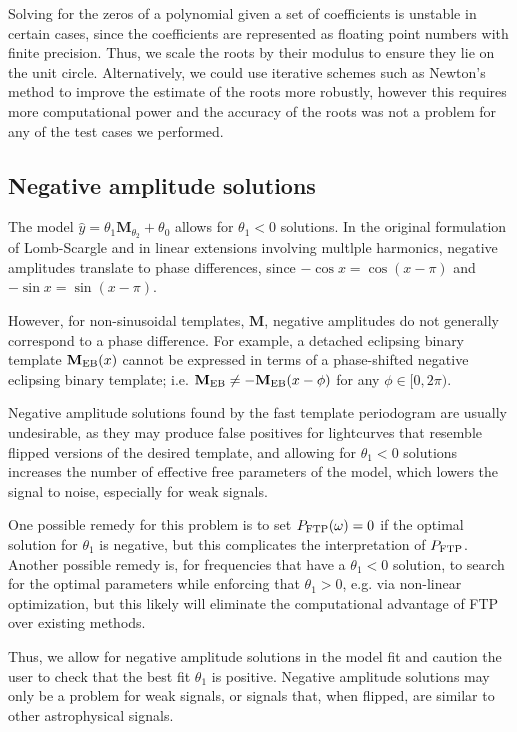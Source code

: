 \documentclass[apj]{emulateapj}
\newcommand{\Mshft}{\mathbf{M}_{\theta_2}}
\begin{document}
Solving for the zeros of a polynomial given a set of coefficients is unstable in certain cases, since the 
coefficients are represented as floating point numbers with finite precision. Thus, we scale the roots
by their modulus to ensure they lie on the unit circle. Alternatively, we could use iterative schemes
such as Newton's method to improve the estimate of the roots more robustly, however this requires more computational power and 
the accuracy of the roots was not a problem for any of the test cases we performed.


\subsection{Negative amplitude solutions}
The model $\hat{y}= \theta_1\Mshft + \theta_0$ allows for $\theta_1 < 0$ solutions. 
In the original formulation of Lomb-Scargle and in linear
extensions involving multlple harmonics, negative amplitudes translate to
phase differences, since $-\cos{x} = \cos(x - \pi)$ and $-\sin{x} = \sin(x - \pi)$.

However, for non-sinusoidal templates, $\mathbf{M}$, negative amplitudes
do not generally correspond to a phase difference. For example, a 
detached eclipsing binary template $\mathbf{M}_{\rm EB}(x)$ cannot be 
expressed in terms of a phase-shifted negative eclipsing binary template; i.e.
$\mathbf{M}_{\rm EB} \neq - \mathbf{M}_{\rm EB}(x - \phi)$ for any $\phi\in[0, 2\pi)$.

Negative amplitude solutions found by the fast template periodogram are usually
undesirable, as they may produce false positives for lightcurves that resemble
flipped versions of the desired template, and allowing for $\theta_1 < 0$ solutions
increases the number of effective free parameters of the model, which lowers
the signal to noise, especially for weak signals.

One possible remedy for this problem is to set $P_{\rm FTP}(\omega) = 0$ if the optimal
solution for $\theta_1$ is negative, but this complicates the interpretation of $P_{\rm FTP}$.
Another possible remedy is, for frequencies that have a $\theta_1 < 0$ solution, 
to search for the optimal parameters while enforcing that $\theta_1 > 0$,
e.g. via non-linear optimization, but this likely will eliminate the computational
advantage of FTP over existing methods.

Thus, we allow for negative amplitude solutions in the model fit and caution
the user to check that the best fit $\theta_1$ is positive. Negative amplitude
solutions may only be a problem for weak signals, or signals that, when flipped, 
are similar to other astrophysical signals.
\end{document}
